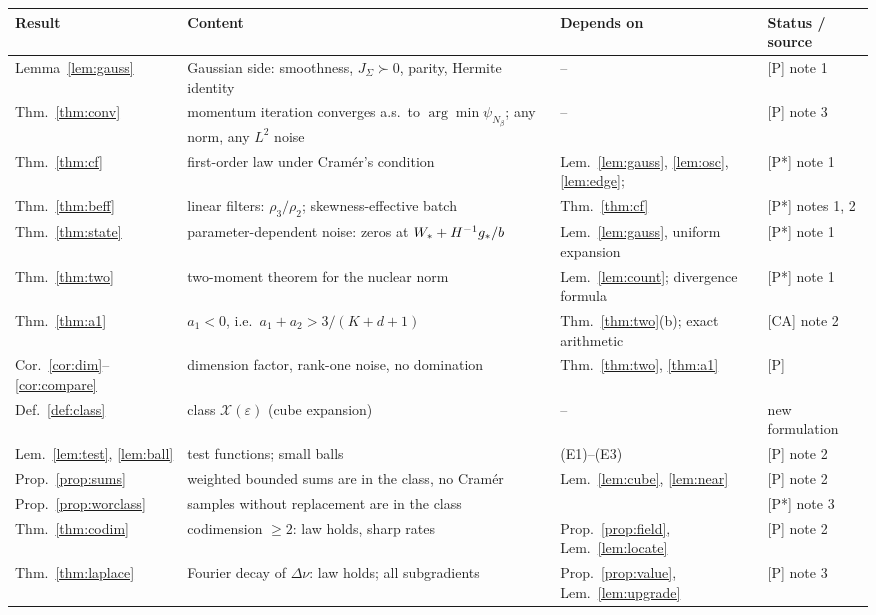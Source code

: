 \documentclass[10pt]{article}
\theoremstyle{definition}
\theoremstyle{remark}
\newcommand{\status}[1]{\textsf{\small[#1]}}
\begin{document}
{\small
\begin{longtable}{@{}p{}p{}p{}p{}@{}}
\toprule
Result & Content & Depends on & Status / source\\
\midrule
\endhead
Lemma~\ref{lem:gauss} & Gaussian side: smoothness, $J_\Sigma\succ0$, parity, Hermite identity & -- & \status{P} note 1\\
Thm.~\ref{thm:conv} & momentum iteration converges a.s.\ to $\arg\min\psi_{N_\beta}$; any norm, any $L^2$ noise & -- & \status{P} note 3\\
Thm.~\ref{thm:cf} & first-order law under Cram\'er's condition & Lem.~\ref{lem:gauss}, \ref{lem:osc}, \ref{lem:edge}; \citet[Thm.~20.1]{br} & \status{P*} note 1\\
Thm.~\ref{thm:beff} & linear filters: $\rho_3/\rho_2$; skewness-effective batch & Thm.~\ref{thm:cf} & \status{P*} notes 1, 2\\
Thm.~\ref{thm:state} & parameter-dependent noise: zeros at $W_\ast+H^{-1}g_\ast/b$ & Lem.~\ref{lem:gauss}, uniform expansion & \status{P*} note 1\\
Thm.~\ref{thm:two} & two-moment theorem for the nuclear norm & Lem.~\ref{lem:count}; divergence formula \citep{candes} & \status{P*} note 1\\
Thm.~\ref{thm:a1} & $a_1<0$, i.e.\ $a_1+a_2>3/(K+d+1)$ & Thm.~\ref{thm:two}(b); exact arithmetic & \status{CA} note 2\\
Cor.~\ref{cor:dim}--\ref{cor:compare} & dimension factor, rank-one noise, no domination & Thm.~\ref{thm:two}, \ref{thm:a1} & \status{P}\\
\midrule
Def.~\ref{def:class} & class $\mathcal X(\varepsilon)$ (cube expansion) & -- & new formulation\\
Lem.~\ref{lem:test}, \ref{lem:ball} & test functions; small balls & (E1)--(E3) & \status{P} note 2\\
Prop.~\ref{prop:sums} & weighted bounded sums are in the class, no Cram\'er & Lem.~\ref{lem:cube}, \ref{lem:near} & \status{P} note 2\\
Prop.~\ref{prop:worclass} & samples without replacement are in the class & \citet{hoeffding} & \status{P*} note 3\\
Thm.~\ref{thm:codim} & codimension $\ge2$: law holds, sharp rates & Prop.~\ref{prop:field}, Lem.~\ref{lem:locate} & \status{P} note 2\\
Thm.~\ref{thm:laplace} & Fourier decay of $\Delta\nu$: law holds; all subgradients & Prop.~\ref{prop:value}, Lem.~\ref{lem:upgrade} & \status{P} note 3\\

\end{longtable}}
\end{document}
